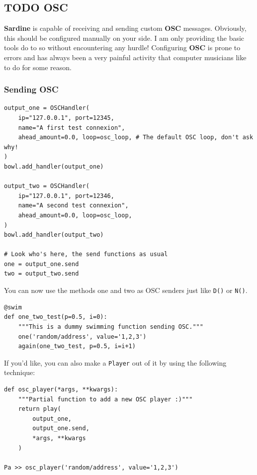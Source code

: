 \documentclass[11pt]{article}
\begin{document}
\subsection{{\bfseries\sffamily TODO} OSC}
\label{sec:orgb46b09e}

\textbf{Sardine} is capable of receiving and sending custom \textbf{OSC} messages. Obviously, this should be configured manually on your side. I am only providing the basic tools do to so without encountering any hurdle! Configuring \textbf{OSC} is prone to errors and has always been a very painful activity that computer musicians like to do for some reason.

\subsubsection{Sending OSC}
\label{sec:org055b8a3}

\begin{verbatim}
output_one = OSCHandler(
    ip="127.0.0.1", port=12345,
    name="A first test connexion",
    ahead_amount=0.0, loop=osc_loop, # The default OSC loop, don't ask why!
)
bowl.add_handler(output_one)

output_two = OSCHandler(
    ip="127.0.0.1", port=12346,
    name="A second test connexion",
    ahead_amount=0.0, loop=osc_loop,
)
bowl.add_handler(output_two)

# Look who's here, the send functions as usual
one = output_one.send
two = output_two.send
\end{verbatim}

You can now use the methods one and two as OSC senders just like \texttt{D()} or \texttt{N()}.

\begin{verbatim}
@swim
def one_two_test(p=0.5, i=0):
    """This is a dummy swimming function sending OSC."""
    one('random/address', value='1,2,3')
    again(one_two_test, p=0.5, i=i+1)
\end{verbatim}

If you'd like, you can also make a \texttt{Player} out of it by using the following technique:

\begin{verbatim}
def osc_player(*args, **kwargs):
    """Partial function to add a new OSC player :)"""
    return play(
        output_one,
        output_one.send,
        *args, **kwargs
    )

Pa >> osc_player('random/address', value='1,2,3')
\end{verbatim}
\end{document}
